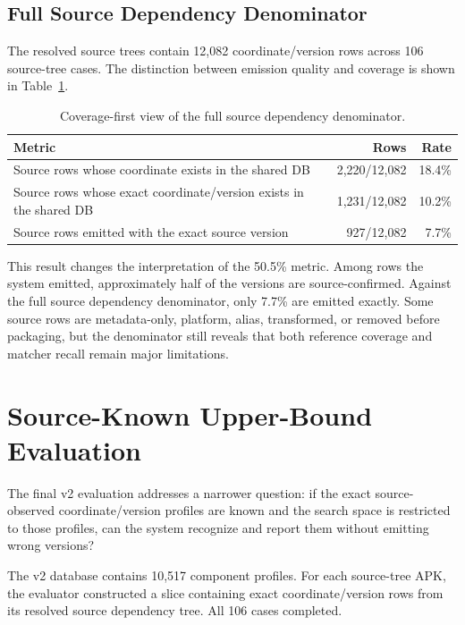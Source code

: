\subsection{Full Source Dependency Denominator}

The resolved source trees contain 12,082 coordinate/version rows across 106
source-tree cases. The distinction between emission quality and coverage is
shown in Table~\ref{tab:pfe-coverage-first}.

\begin{table}[H]
\centering
\caption{Coverage-first view of the full source dependency denominator.}
\label{tab:pfe-coverage-first}
\begin{tabularx}{\textwidth}{Xrr}
\toprule
\textbf{Metric} & \textbf{Rows} & \textbf{Rate}\\
\midrule
Source rows whose coordinate exists in the shared DB & 2,220/12,082 & 18.4\%\\
Source rows whose exact coordinate/version exists in the shared DB &
1,231/12,082 & 10.2\%\\
Source rows emitted with the exact source version & 927/12,082 & 7.7\%\\
\bottomrule
\end{tabularx}
\end{table}

This result changes the interpretation of the 50.5\% metric. Among rows the
system emitted, approximately half of the versions are source-confirmed.
Against the full source dependency denominator, only 7.7\% are emitted
exactly. Some source rows are metadata-only, platform, alias, transformed, or
removed before packaging, but the denominator still reveals that both
reference coverage and matcher recall remain major limitations.

\section{Source-Known Upper-Bound Evaluation}

The final v2 evaluation addresses a narrower question: if the exact
source-observed coordinate/version profiles are known and the search space is
restricted to those profiles, can the system recognize and report them
without emitting wrong versions?

The v2 database contains 10,517 component profiles. For each source-tree APK,
the evaluator constructed a slice containing exact coordinate/version rows
from its resolved source dependency tree. All 106 cases completed.

